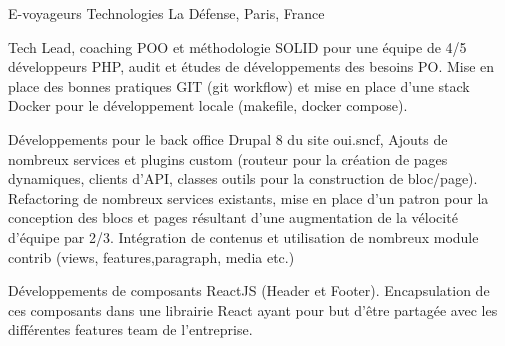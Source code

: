 \cventry
{} %
{E-voyageurs Technologies} %
{La Défense, Paris, France} %
{} %
{
\begin{cvsubentries}
    \begin{cvitems} %
        \item
        {
        }
        \item
        {
        }
    \end{cvitems}
    \begin{cvitems} %
        \item
        {
            Tech Lead, coaching POO et méthodologie SOLID pour une équipe de 4/5 développeurs PHP, audit et études
            de développements des besoins PO. Mise en place des bonnes pratiques GIT (git workflow) et mise en place
            d'une stack Docker pour le développement locale (makefile, docker compose).
        }
        \item
        {
            Développements pour le back office Drupal 8 du site oui.sncf, Ajouts de nombreux services et plugins custom
            (routeur pour la création de pages dynamiques, clients d’API, classes outils pour la construction de bloc/page).
            Refactoring de nombreux services existants, mise en place d’un patron pour la conception des blocs et pages
            résultant d'une augmentation de la vélocité d’équipe par 2/3. Intégration de contenus et utilisation de nombreux
            module contrib (views, features,paragraph, media etc.)
        }
        \item
        {
            Développements de composants ReactJS (Header et Footer). Encapsulation de ces composants dans une librairie React ayant
            pour but d’être partagée avec les différentes features team de l’entreprise.
        }
    \end{cvitems}
\end{cvsubentries}
}

